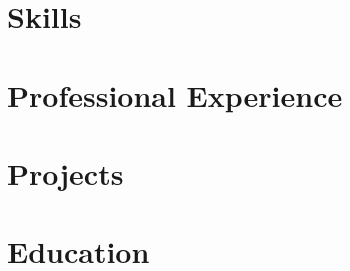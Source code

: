 \documentclass[4pt]{article}
\begin{document}
\pagestyle{others}\thispagestyle{first_page}



\section{Skills}



\section{Professional Experience}



\section{Projects}


\section{Education}

\end{document}
